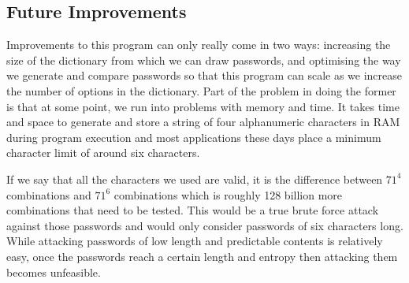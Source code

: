 \documentclass[10pt,journal,compsoc]{IEEEtran}
\begin{document}
\subsection{Future Improvements}

Improvements to this program can only really come in two ways: increasing the
size of the dictionary from which we can draw passwords, and optimising the way
we generate and compare passwords so that this program can scale as we increase
the number of options in the dictionary. Part of the problem in doing the former
is that at some point, we run into problems with memory and time. It takes time
and space to generate and store a string of four alphanumeric characters in RAM
during program execution and most applications these days place a minimum
character limit of around six characters.

If we say that all the characters we used are valid, it is the difference
between $71^{4}$ combinations and $71^{6}$ combinations which is roughly 128
billion more combinations that need to be tested. This would be a true brute
force attack against those passwords and would only consider passwords of six
characters long. While attacking passwords of low length and predictable
contents is relatively easy, once the passwords reach a certain length and
entropy then attacking them becomes unfeasible.




%
%

\end{document}

